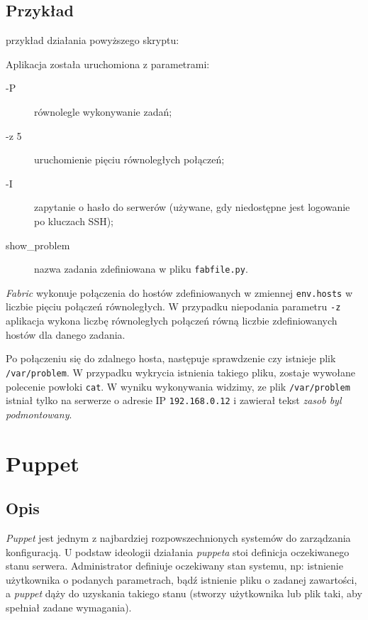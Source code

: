 \subsection{Przykład}

przykład działania powyższego skryptu:

Aplikacja została uruchomiona z parametrami:
\begin{description}
\item[-P] równolegle wykonywanie zadań;
\item[-z 5] uruchomienie pięciu równoległych połączeń;
\item[-I] zapytanie o hasło do serwerów (używane, gdy niedostępne jest logowanie po kluczach SSH);
\item[show\_problem] nazwa zadania zdefiniowana w pliku \texttt{fabfile.py}.
\end{description}
\textit{Fabric} wykonuje połączenia do hostów zdefiniowanych w zmiennej \texttt{env.hosts} w liczbie pięciu połączeń równoległych.
W przypadku niepodania parametru \texttt{-z} aplikacja wykona liczbę równoległych połączeń równą liczbie zdefiniowanych hostów dla danego zadania.

Po połączeniu się do zdalnego hosta, następuje sprawdzenie czy istnieje plik \texttt{/var/problem}. W przypadku wykrycia istnienia takiego pliku, zostaje wywołane polecenie powłoki \texttt{cat}.
W wyniku wykonywania widzimy, ze plik \texttt{/var/problem} istniał tylko na serwerze o adresie IP \texttt{192.168.0.12} i zawierał tekst \textit{zasob byl podmontowany}.
\section{Puppet}
\subsection{Opis}
\label{sec:puppet_opis}
\textit{Puppet} jest jednym z najbardziej rozpowszechnionych systemów do zarządzania konfiguracją.
U podstaw ideologii działania \textit{puppeta} stoi definicja oczekiwanego stanu serwera.
Administrator definiuje oczekiwany stan systemu, np: istnienie użytkownika o podanych parametrach, bądź istnienie pliku o zadanej zawartości, a \textit{puppet} dąży do uzyskania takiego stanu (stworzy użytkownika lub plik taki, aby spełniał zadane wymagania).


